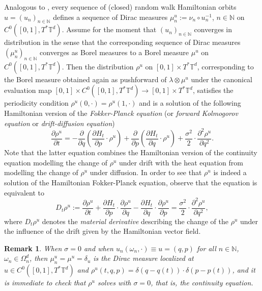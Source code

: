 \documentclass[a4paper,11pt]{amsart}
\newcommand{\NN}{\mathbb{N}}
\newcommand{\TT}{\mathbb{T}}
\newtheorem{remark}[theorem]{Remark}
\begin{document}
Analogous to , every sequence of (closed) random walk Hamiltonian orbits $u=(u_n)_{n\in\NN}$ defines a sequence of Dirac measures $\mu_n^u:=\nu_n\circ u_n^{-1}$, $n\in\NN$ on $C^0([0,1],T^*\TT^d)$. Assume for the moment that $(u_n)_{n\in\NN}$ converges in distribution in the sense that the corresponding sequence of Dirac measures $(\mu_n^u)_{n\in\NN}$ converges as Borel measures to a Borel measure $\mu^u$ on $C^0([0,1],T^*\TT^d)$. Then the distribution $\rho^u$ on $[0,1]\times T^*\TT^d$, corresponding to the Borel measure obtained again as pushforward of $\lambda\otimes\mu^u$ under the canonical evaluation map $[0,1]\times C^0([0,1],T^*\TT^d)\to [0,1]\times T^*\TT^d$, satisfies the periodicity condition $\rho^u(0,\cdot)=\rho^u(1,\cdot)$ and is a solution of the following Hamiltonian version of the \emph{Fokker-Planck equation} (or \emph{forward Kolmogorov equation} or \emph{drift-diffusion equation})  \begin{equation}\label{Fokker-Planck}\frac{\partial\rho^u}{\partial t}=-\frac{\partial}{\partial q}\left(\frac{\partial H_t}{\partial p}\cdot \rho^u\right)+\frac{\partial}{\partial p}\left(\frac{\partial H_t}{\partial q}\cdot \rho^u\right)+\frac{\sigma^2}{2}\cdot\frac{\partial^2\rho^u}{\partial q^2}.\end{equation} Note that the latter equation combines the Hamiltonian version of the continuity equation modelling the change of $\rho^u$ under drift with the heat equation from  modelling the change of $\rho^u$ under diffusion. In order to see that $\rho^u$ is indeed a solution of the Hamiltonian Fokker-Planck equation, observe that 
the equation is equivalent to 
\[D_t\rho^u:=\frac{\partial\rho^u}{\partial t}+\frac{\partial H_t}{\partial p}\cdot \frac{\partial\rho^u}{\partial q}-\frac{\partial H_t}{\partial q}\cdot \frac{\partial\rho^u}{\partial p}=\frac{\sigma^2}{2}\cdot\frac{\partial^2\rho^u}{\partial q^2},\]
where $D_t\rho^u$ denotes the \emph{material derivative} describing the change of the $\rho^u$ under the influence of the drift given by the Hamiltonian vector field. 
\begin{remark} When $\sigma=0$ and when $u_n(\omega_n,\cdot)\equiv u=(q,p)$ for all $n\in\NN$, $\omega_n\in\Omega_n^d$, then $\mu_n^u=\mu^u=\delta_u$ is the Dirac measure localized at $u\in C^0([0,1],T^*\TT^d)$ and $\rho^u(t,q,p)=\delta(q-q(t))\cdot\delta(p-p(t))$, and it is immediate to check that $\rho^u$ solves  with $\sigma=0$, that is, the continuity equation. \end{remark}    
\end{document}
